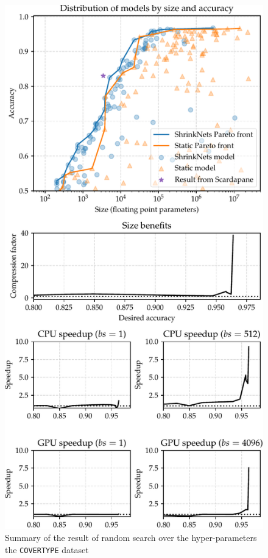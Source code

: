 \begin{figure}
\begin{center}
\includegraphics[width=\columnwidth]{COVER_FC_summary}
\vspace*{-5mm}
\caption{\label{figure_COVER} Summary of the result of random
search over the hyper-parameters the \texttt{COVERTYPE} dataset}
\end{center}
\vspace*{-4mm}
\end{figure}


